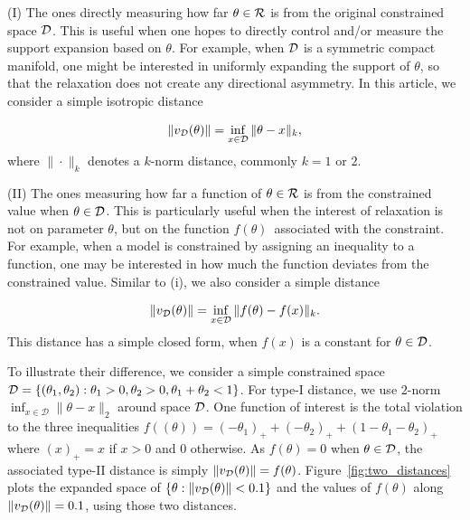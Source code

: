 \documentclass[10pt,fleqn]{article}
\DeclareMathOperator{\1}{\mathbbm{1}} \DeclareMathOperator{\bigO}{\mc O}
\begin{document}
(I) The ones directly measuring how far $\theta \in \mathcal{R}$ is from the original constrained space $\mathcal{D}$. This is useful when one hopes to directly control and/or measure the support expansion based on $\theta$. For example, when $\mathcal{D}$ is a symmetric compact manifold, one might be interested in uniformly expanding the support of $\theta$, so that the relaxation does not create any directional asymmetry. In this article, we consider a simple isotropic distance

\begin{eqnarray}
\|v_{\mathcal{D}}(\theta)\| = \inf_{x\in\mathcal{D}} \|\theta-x\|_k,
\end{eqnarray}
where $\|\cdot\|_k$ denotes a $k$-norm distance, commonly $k=1$ or $2$.

(II) The ones measuring how far a function of $\theta \in \mathcal{R}$ is from the constrained value when $\theta\in \mathcal{D}$. This is particularly useful when the interest of relaxation is not on parameter $\theta$, but on the function $f(\theta)$\ associated with the constraint. For example, when a model is constrained by assigning an inequality to a function, one may be interested in how much the function deviates from the constrained value. Similar to (i), we also consider a simple distance

\begin{eqnarray}
\|v_{\mathcal{D}}(\theta)\| = \inf_{x\in\mathcal{D}} \|f(\theta)-f(x)\|_k.
\end{eqnarray}
This distance has a simple closed form, when $f(x)$ is a constant for $\theta\in \mathcal{D}$.

To illustrate their difference, we consider a simple constrained space $\mathcal{D}=\{(\theta_1,\theta_2):  \theta_1 >0, \theta_2>0, \theta_1+\theta_2<1\}$. For type-I distance, we use $2$-norm $\inf_{x\in\mathcal{D}} \|\theta-x\|_{2}$ around space $\mathcal{D}$. One function of interest is the total violation to the three inequalities $f((\theta))= (-\theta_1)_+ + (-\theta_2)_+ + (1-\theta_1-\theta_2)_+$ where $(x)_+ = x$ if $x>0$ and $0$ otherwise. As $f(\theta)=0$ when $\theta\in \mathcal{D}$, the associated type-II distance is simply
$\|v_{\mathcal{D}}(\theta)\| =f (\theta)$. Figure~\ref{fig:two_distances}
plots the expanded space of $\{\theta: \|v_{\mathcal{D}}(\theta)\|< 0.1\}$ and the values of $f(\theta)$ along $\|v_{\mathcal{D}}(\theta)\| = 0.1$, using those
two distances.
\end{document}
